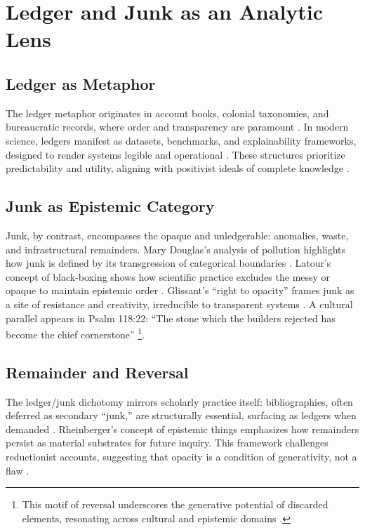 \documentclass[12pt]{article}
\begin{document}
\section{Ledger and Junk as an Analytic Lens}

\subsection{Ledger as Metaphor}
The ledger metaphor originates in account books, colonial taxonomies, and bureaucratic records, where order and transparency are paramount \citep{poovey1998}. In modern science, ledgers manifest as datasets, benchmarks, and explainability frameworks, designed to render systems legible and operational \citep{gitelman2013}. These structures prioritize predictability and utility, aligning with positivist ideals of complete knowledge \citep{hacking1983}.

\subsection{Junk as Epistemic Category}
Junk, by contrast, encompasses the opaque and unledgerable: anomalies, waste, and infrastructural remainders. Mary Douglas’s analysis of pollution highlights how junk is defined by its transgression of categorical boundaries \citep{douglas1966}. Latour’s concept of black-boxing shows how scientific practice excludes the messy or opaque to maintain epistemic order \citep{latour1987}. Glissant’s ``right to opacity'' frames junk as a site of resistance and creativity, irreducible to transparent systems \citep{glissant1997}. A cultural parallel appears in Psalm 118:22: ``The stone which the builders rejected has become the chief cornerstone'' \footnote{This motif of reversal underscores the generative potential of discarded elements, resonating across cultural and epistemic domains \citep{douglas1966, latour1987, glissant1997}.}.

\subsection{Remainder and Reversal}
The ledger/junk dichotomy mirrors scholarly practice itself: bibliographies, often deferred as secondary ``junk,'' are structurally essential, surfacing as ledgers when demanded \citep{rheinberger1997}. Rheinberger’s concept of epistemic things emphasizes how remainders persist as material substrates for future inquiry. This framework challenges reductionist accounts, suggesting that opacity is a condition of generativity, not a flaw \citep{barad2007}.
\end{document}
